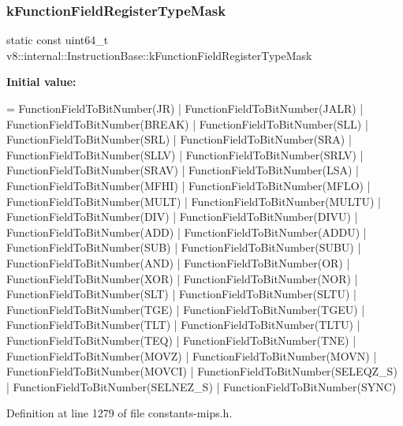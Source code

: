 \subsubsection{\texorpdfstring{k\+Function\+Field\+Register\+Type\+Mask}{kFunctionFieldRegisterTypeMask}}
{\footnotesize\ttfamily static const uint64\+\_\+t v8\+::internal\+::\+Instruction\+Base\+::k\+Function\+Field\+Register\+Type\+Mask\hspace{0.3cm}{\ttfamily [static]}}

{\bfseries Initial value\+:}
\begin{DoxyCode}
=
      FunctionFieldToBitNumber(JR) | FunctionFieldToBitNumber(JALR) |
      FunctionFieldToBitNumber(BREAK) | FunctionFieldToBitNumber(SLL) |
      FunctionFieldToBitNumber(SRL) | FunctionFieldToBitNumber(SRA) |
      FunctionFieldToBitNumber(SLLV) | FunctionFieldToBitNumber(SRLV) |
      FunctionFieldToBitNumber(SRAV) | FunctionFieldToBitNumber(LSA) |
      FunctionFieldToBitNumber(MFHI) | FunctionFieldToBitNumber(MFLO) |
      FunctionFieldToBitNumber(MULT) | FunctionFieldToBitNumber(MULTU) |
      FunctionFieldToBitNumber(DIV) | FunctionFieldToBitNumber(DIVU) |
      FunctionFieldToBitNumber(ADD) | FunctionFieldToBitNumber(ADDU) |
      FunctionFieldToBitNumber(SUB) | FunctionFieldToBitNumber(SUBU) |
      FunctionFieldToBitNumber(AND) | FunctionFieldToBitNumber(OR) |
      FunctionFieldToBitNumber(XOR) | FunctionFieldToBitNumber(NOR) |
      FunctionFieldToBitNumber(SLT) | FunctionFieldToBitNumber(SLTU) |
      FunctionFieldToBitNumber(TGE) | FunctionFieldToBitNumber(TGEU) |
      FunctionFieldToBitNumber(TLT) | FunctionFieldToBitNumber(TLTU) |
      FunctionFieldToBitNumber(TEQ) | FunctionFieldToBitNumber(TNE) |
      FunctionFieldToBitNumber(MOVZ) | FunctionFieldToBitNumber(MOVN) |
      FunctionFieldToBitNumber(MOVCI) | FunctionFieldToBitNumber(SELEQZ\_S) |
      FunctionFieldToBitNumber(SELNEZ\_S) | FunctionFieldToBitNumber(SYNC)
\end{DoxyCode}


Definition at line 1279 of file constants-\/mips.\+h.

\mbox{\label{classv8_1_1internal_1_1InstructionBase_a30a7c8fc99e3c10ff0f32516127681a4}} 
